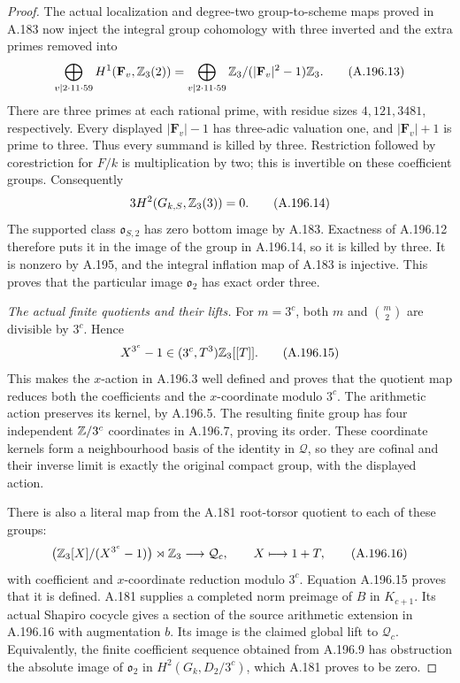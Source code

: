\begin{proof}
The actual localization and degree-two group-to-scheme maps
proved in A.183 now inject the integral group cohomology with
three inverted and the extra primes removed into
\[
 \bigoplus_{v\mid2\cdot11\cdot59}
 H^1(\mathbf F_v,\mathbb Z_3(2))
 =\bigoplus_{v\mid2\cdot11\cdot59}
               \mathbb Z_3/(|\mathbf F_v|^2-1)\mathbb Z_3.
\tag{A.196.13}
\]
There are three primes at each rational prime, with residue
sizes \(4,121,3481\), respectively.  Every displayed
\(|\mathbf F_v|-1\) has three-adic valuation one, and
\(|\mathbf F_v|+1\) is prime to three.  Thus every summand
is killed by three.  Restriction followed by corestriction
for \(F/k\) is multiplication by two; this is invertible
on these coefficient groups.  Consequently
\[
             3H^2(G_{k,S},\mathbb Z_3(3))=0.
\tag{A.196.14}
\]
The supported class \(\mathfrak o_{S,2}\) has zero bottom
image by A.183.  Exactness of A.196.12 therefore puts it in
the image of the group in A.196.14, so it is killed by three.
It is nonzero by A.195, and the integral inflation map of
A.183 is injective.  This proves that the particular image
\(\mathfrak o_2\) has exact order three.

\emph{The actual finite quotients and their lifts.}
For \(m=3^c\), both \(m\) and \(\binom m2\) are divisible
by \(3^c\).  Hence
\[
             X^{3^c}-1\in(3^c,T^3)\mathbb Z_3[[T]].
\tag{A.196.15}
\]
This makes the \(x\)-action in A.196.3 well defined and
proves that the quotient map reduces both the coefficients
and the \(x\)-coordinate modulo \(3^c\).  The arithmetic
action preserves its kernel, by A.196.5.  The resulting
finite group has four independent \(\mathbb Z/3^c\) coordinates
in A.196.7, proving its order.  These coordinate kernels
form a neighbourhood basis of the identity in \(\mathcal Q\),
so they are cofinal and their inverse limit is exactly the
original compact group, with the displayed action.

There is also a literal map from the A.181 root-torsor
quotient to each of these groups:
\[
 \bigl(\mathbb Z_3[X]/(X^{3^c}-1)\bigr)\rtimes\mathbb Z_3
       \longrightarrow\mathcal Q_c,
 \qquad X\longmapsto1+T,
\tag{A.196.16}
\]
with coefficient and \(x\)-coordinate reduction modulo
\(3^c\).  Equation A.196.15 proves that it is defined.
A.181 supplies a completed norm preimage of \(B\) in
\(K_{c+1}\).  Its actual Shapiro cocycle gives a section
of the source arithmetic extension in A.196.16 with
augmentation \(b\).  Its image is the claimed global lift
to \(\mathcal Q_c\).  Equivalently, the finite coefficient
sequence obtained from A.196.9 has obstruction the absolute
image of \(\mathfrak o_2\) in \(H^2(G_k,D_2/3^c)\),
which A.181 proves to be zero.


\end{proof}
